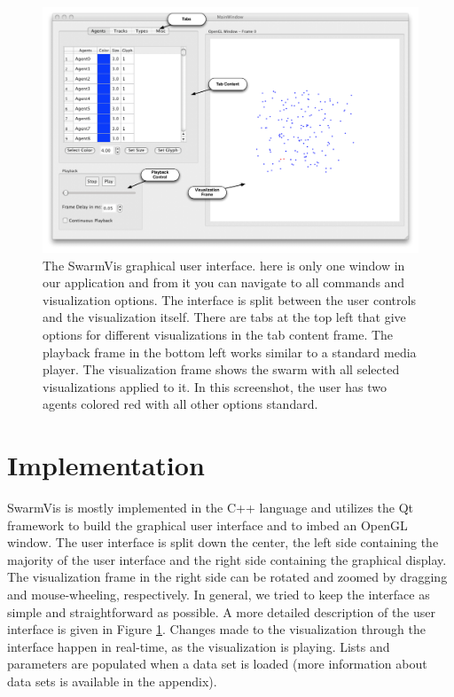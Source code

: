 \documentclass[conference]{IEEEtran}
\begin{document}
\begin{figure}[ht]
\centering
\includegraphics[scale=.45]{images/swarmvis-annotated.pdf}
\caption{The SwarmVis graphical user interface. 
here is only one window in our application and from it you can navigate to all commands and visualization options.
The interface is split between the user controls and the visualization itself. There are tabs at the top left that give
options for different visualizations in the tab content frame. The playback frame in the bottom left works similar to a
standard media player. The visualization frame shows the swarm with all selected visualizations applied to it. In this
screenshot, the user has two agents colored red with all other options standard. }
\label{AnnotatedWindow}
\end{figure}

\section{Implementation}
SwarmVis is mostly  implemented in the C++ language and utilizes the Qt framework\cite{Qt:website}
to build the graphical user interface and to imbed an OpenGL window.
The user interface is split down the center,
the left side containing the majority of the user interface and the right side containing the graphical display.
The visualization frame in the right side can be rotated and zoomed by dragging and mouse-wheeling, respectively.
In general, we tried to keep the interface as simple and straightforward as possible.
A more detailed description of the user interface is given in Figure \ref{AnnotatedWindow}.
Changes made to the visualization through the interface happen in real-time, as the visualization is playing.
Lists and parameters are populated when a data set is loaded (more information about data sets is available in the appendix).
\end{document}
